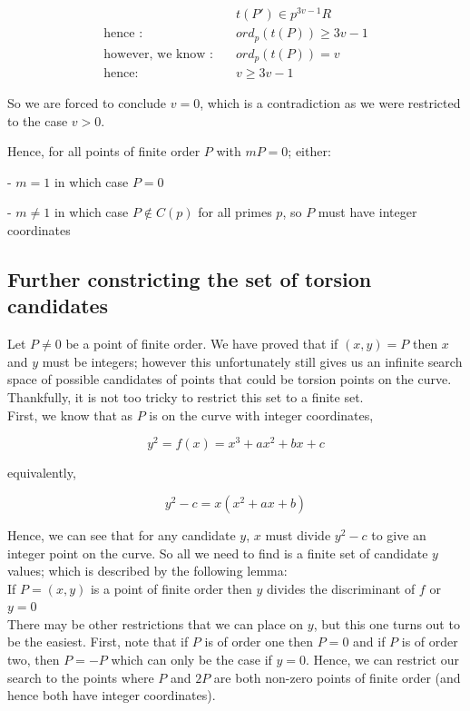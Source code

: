 \documentclass{article}
\begin{document}
\begin{align*}
    & t(P') \in p^{3v-1}R\\
    \text{hence :} \quad & ord_p(t(P)) \geq 3v - 1 \\
    \text{however, we know :} \quad & ord_p(t(P)) = v\\
    \text{hence: } \quad & v \geq 3v - 1
\end{align*}

So we are forced to conclude $v = 0$, which is a contradiction as we were restricted to the case $v > 0$.

Hence, for all points of finite order $P$ with $mP = 0$; either:

- $m = 1$ in which case $P = 0$

- $m \neq 1$ in which case $P \notin C(p)$ for all primes $p$, so $P$ must have integer coordinates

\subsection{Further constricting the set of torsion candidates}

Let $P \neq 0$ be a point of finite order. We have proved that if $(x, y) = P$ then $x$ and $y$ must be integers; however this unfortunately still gives us an infinite search space of possible candidates of points that could be torsion points on the curve. Thankfully, it is not too tricky to restrict this set to a finite set.\\

First, we know that as $P$ is on the curve with integer coordinates, 

\[ y^2 = f(x) = x^3 + a x^2 + b x + c \]

equivalently,

\[ y^2 - c = x(x^2 + a x + b) \]

Hence, we can see that for any candidate $y$, $x$ must divide $y^2 - c$ to give an integer point on the curve. So all we need to find is a finite set of candidate $y$ values; which is described by the following lemma:\\

If $P = (x, y)$ is a point of finite order then $y$ divides the discriminant of $f$ or $y = 0$\\

There may be other restrictions that we can place on $y$, but this one turns out to be the easiest. First, note that if $P$ is of order one then $P = 0$ and if $P$ is of order two, then $P = -P$ which can only be the case if $y = 0$. Hence, we can restrict our search to the points where $P$ and $2P$ are both non-zero points of finite order (and hence both have integer coordinates).
\end{document}
